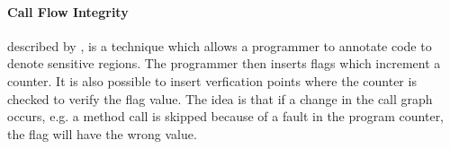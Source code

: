 \paragraph{Call Flow Integrity} described by \cite{agl}, is a technique which allows a programmer to annotate code to denote sensitive regions. The programmer then inserts flags which increment a counter. It is also possible to insert verfication points where the counter is checked to verify the flag value. The idea is that if a change in the call graph occurs, e.g. a method call is skipped because of a fault in the program counter, the flag will have the wrong value.
